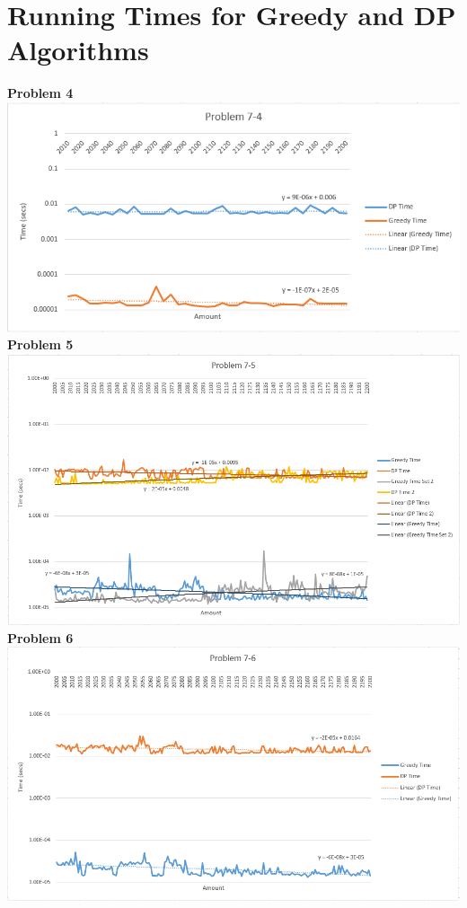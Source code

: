 \documentclass[11pt,letterpaper]{article}
\begin{document}
\section{Running Times for Greedy and DP Algorithms}
	\textbf{Problem 4}\\
	\hskip-1.0cm\includegraphics[width=6.5in]{p7-4.png}\\
	\textbf{Problem 5}\\
	\hskip-1.0cm\includegraphics[width=6.5in]{p7-5.png}\\
	\textbf{Problem 6}\\
	\hskip-1.0cm\includegraphics[width=6.5in]{p7-6.png}\\
	
\end{document}
